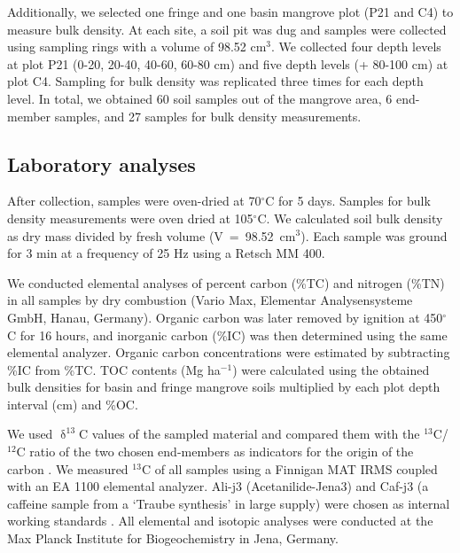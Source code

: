 \DIFaddend Additionally, we selected one fringe and one basin mangrove plot (P21 and C4) to measure bulk density. At each site, a soil pit was dug \DIFaddbegin {}\DIFaddend and samples were collected using sampling rings with a volume of 98.52 cm$^3$. We collected four depth levels at plot P21 (0-20, 20-40, 40-60, 60-80 cm) and five depth levels (+ 80-100 cm) at plot C4. Sampling for bulk density was replicated three times for each depth level. In total, we obtained 60 soil samples out of the mangrove area, 6 end-member samples, and 27 samples for bulk density measurements.
\label{sec:2}

\subsection{Laboratory analyses}
After collection, samples were oven-dried at 70$^{\circ}$C for 5 days. Samples for bulk density measurements were oven dried at 105$^{\circ}$C. We calculated soil bulk density as dry mass divided by fresh volume \mbox{(V = 98.52 cm$^3$)}. Each sample was ground for 3 min at a frequency of 25 Hz using a \DIFaddbegin {}\DIFaddend Retsch MM 400\DIFdelbegin {}\DIFdelend \DIFaddbegin {}\DIFaddend . 

We conducted elemental analyses of percent  carbon (\%TC) and nitrogen (\%TN) in all samples by dry combustion (Vario Max, Elementar Analysensysteme GmbH, Hanau, Germany). Organic carbon was later removed by ignition at 450$^{\circ}$C for 16 hours, and inorganic carbon  (\%IC) was then determined using the same elemental analyzer. Organic carbon concentrations were estimated by subtracting \%IC from \%TC. TOC contents (Mg ha$^{-1}$) were calculated using the obtained bulk densities for basin and fringe mangrove soils multiplied by each plot depth interval (cm) and \%OC.

We used $\updelta^{13}$C values of the sampled material and compared them with the  $^{13}$C/$^{12}$C ratio of the two chosen end-members as indicators for the origin of the carbon \DIFaddbegin {}\DIFaddend . We measured $^{13}$C of all samples using a Finnigan MAT IRMS coupled with an EA 1100 elemental analyzer. Ali-j3 (Acetanilide-Jena3) and Caf-j3 (a caffeine sample from a `Traube synthesis' in large supply) were chosen as internal working standards \citep{werner2001}. All elemental and isotopic analyses were conducted at the Max Planck Institute for Biogeochemistry in Jena, Germany.

